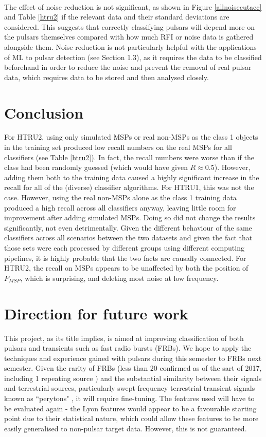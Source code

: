 \documentclass[12pt]{article}
\begin{document}
\paragraph{}
The effect of noise reduction is not significant, as shown in Figure \ref{allnoisecutacc} and Table \ref{htru2} if the relevant data and their standard deviations are considered. This suggests that correctly classifying pulsars will depend more on the pulsars themselves compared with how much RFI or noise data is gathered alongside them. Noise reduction is not particularly helpful with the applications of ML to pulsar detection (see Section 1.3), as it requires the data to be classified beforehand in order to reduce the noise and prevent the removal of real pulsar data, which requires data to be stored and then analysed closely.

\section{Conclusion}
For HTRU2, using only simulated MSPs or real non-MSPs as the class 1 objects in the training set produced low recall numbers on the real MSPs for all classifiers (see Table \ref{htru2}). In fact, the recall numbers were worse than if the class had been randomly guessed (which would have given $R \approx 0.5$). However, adding them both to the training data caused a highly significant increase in the recall for all of the (diverse) classifier algorithms. For HTRU1, this was not the case. However, using the real non-MSPs alone as the class 1 training data produced a high recall across all classifiers anyway, leaving little room for improvement after adding simulated MSPs. Doing so did not change the results significantly, not even detrimentally. Given the different behaviour of the same classifiers across all scenarios between the two datasets and given the fact that those sets were each processed by different groups using different computing pipelines, it is highly probable that the two facts are causally connected. For HTRU2, the recall on MSPs appears to be unaffected by both the position of $P_{MSP}$, which is surprising, and deleting most noise at low frequency.

\section{Direction for future work}
This project, as its title implies, is aimed at improving classification of both pulsars and transients such as fast radio bursts (FRBs). We hope to apply the techniques and experience gained with pulsars during this semester to FRBs next semester. Given the rarity of FRBs (less than 20 confirmed as of the sart of 2017, including 1 repeating source \cite{scholz2016repeating}) and the substantial similarity between their signals and terrestrial sources, particularly swept-frequency terrestrial transient signals known as ``perytons" \cite{petroff2015identifying}, it will require fine-tuning. The features used will have to be evaluated again - the Lyon features would appear to be a favourable starting point due to their statistical nature, which could allow these features to be more easily generalised to non-pulsar target data. However, this is not guaranteed.
\end{document}
